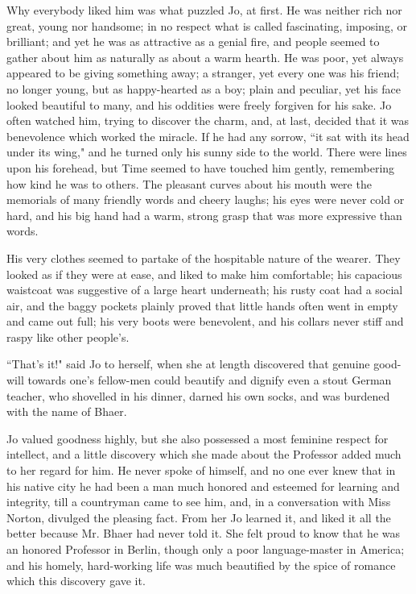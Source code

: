 Why everybody liked him was what puzzled Jo, at first. He was neither
rich nor great, young nor handsome; in no respect what is called
fascinating, imposing, or brilliant; and yet he was as attractive as a
genial fire, and people seemed to gather about him as naturally as about
a warm hearth. He was poor, yet always appeared to be giving something
away; a stranger, yet every one was his friend; no longer young, but as
happy-hearted as a boy; plain and peculiar, yet his face looked
beautiful to many, and his oddities were freely forgiven for his sake.
Jo often watched him, trying to discover the charm, and, at last,
decided that it was benevolence which worked the miracle. If he had any
sorrow, ``it sat with its head under its wing," and he turned only his
sunny side to the world. There were lines upon his forehead, but Time
seemed to have touched him gently, remembering how kind he was to
others. The pleasant curves about his mouth were the memorials of many
friendly words and cheery laughs; his eyes were never cold or hard, and
his big hand had a warm, strong grasp that was more expressive than
words.

His very clothes seemed to partake of the hospitable nature of the
wearer. They looked as if they were at ease, and liked to make him
comfortable; his capacious waistcoat was suggestive of a large heart
underneath; his rusty coat had a social air, and the baggy pockets
plainly proved that little hands often went in empty and came out full;
his very boots were benevolent, and his collars never stiff and raspy
like other people's.

``That's it!" said Jo to herself, when she at length
discovered that genuine good-will towards one's
fellow-men could beautify and dignify even a stout German teacher, who
shovelled in his dinner, darned his own socks, and was burdened with the
name of Bhaer.

Jo valued goodness highly, but she also possessed a most feminine
respect for intellect, and a little discovery which she made about the
Professor added much to her regard for him. He never spoke of himself,
and no one ever knew that in his native city he had been a man much
honored and esteemed for learning and integrity, till a countryman came
to see him, and, in a conversation with Miss Norton, divulged the
pleasing fact. From her Jo learned it, and liked it all the better
because Mr. Bhaer had never told it. She felt proud to know that he was
an honored Professor in Berlin, though only a poor language-master in
America; and his homely, hard-working life was much beautified by the
spice of romance which this discovery gave it.

